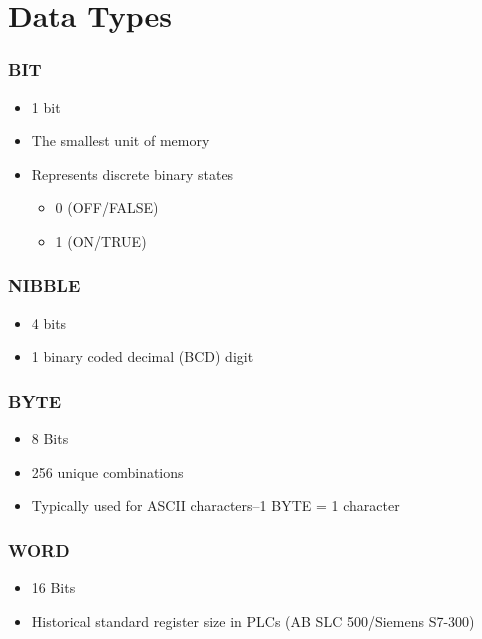 \section{Data Types}

\begin{frame}
    \frametitle{BIT}

    \begin{itemize}
        \item 1 bit
        \item The smallest unit of memory
        \item Represents discrete binary states
        \begin{itemize}
            \item 0 (OFF/FALSE)
            \item 1 (ON/TRUE)
        \end{itemize}
    \end{itemize}
\end{frame}

\begin{frame}
    \frametitle{NIBBLE}

    \begin{itemize}
        \item 4 bits
        \item 1 binary coded decimal (BCD) digit
    \end{itemize}
\end{frame}

\begin{frame}
    \frametitle{BYTE}

    \begin{itemize}
        \item 8 Bits
        \item 256 unique combinations
        \item Typically used for ASCII characters--1 BYTE = 1 character
    \end{itemize}
\end{frame}

\begin{frame}
    \frametitle{WORD}

    \begin{itemize}
        \item 16 Bits
        \item Historical standard register size in PLCs (AB SLC 500/Siemens S7-300)
    \end{itemize}
\end{frame}

